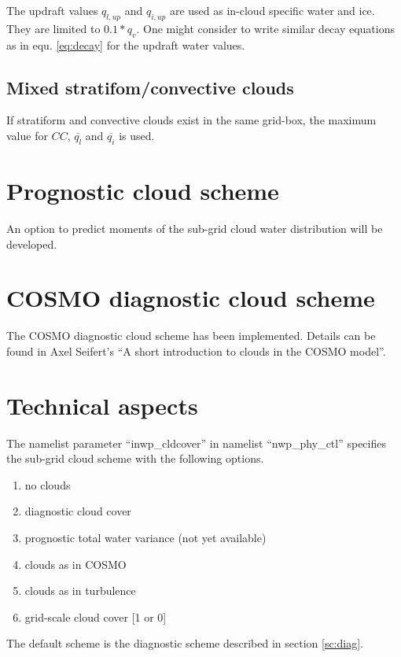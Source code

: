 \documentclass[a4paper,11pt]{article}
\begin{document}
The updraft values $q_{l,up}$ and $q_{i,up}$ are used as in-cloud specific water and ice.  They are limited to $0.1*q_v$.
One might consider to write similar decay equations as in equ. \ref{eq:decay} for the updraft water values.


\subsection{Mixed stratifom/convective clouds}

If stratiform and convective clouds exist in the same grid-box, 
the maximum value for $CC$, $\overline{q_l}$ and $\overline{q_i}$ is used.



\section{Prognostic cloud scheme}

An option to predict moments of the sub-grid cloud water distribution will be
developed.  



\section{COSMO diagnostic cloud scheme}

The COSMO diagnostic cloud scheme has been implemented.  Details can be found in 
Axel Seifert's ``A short introduction to clouds in the COSMO model''.

\section{Technical aspects}

The namelist parameter ``inwp\_cldcover''
in namelist ``nwp\_phy\_ctl'' specifies the sub-grid cloud scheme with the following options.
\begin{enumerate}[start=0]
\item no clouds
\item diagnostic cloud cover
\item prognostic total water variance (not yet available)
\item clouds as in COSMO
\item clouds as in turbulence
\item grid-scale cloud cover [1 or 0]
\end{enumerate}
The default scheme is the diagnostic scheme described in section \ref{sc:diag}.
\end{document}
